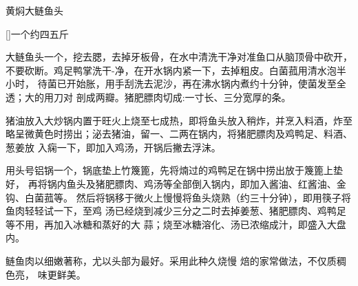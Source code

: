 \begin{recipe}{黄焖大鲢鱼头}

\ingredients

[\footnotemark]{一个约四五斤}

\preparation

\step 大鲢鱼头一个，挖去腮，去掉牙板骨，在水中清洗干净对准鱼口从脑顶骨中砍开，
不要砍断。鸡足鸭掌洗干-净，在开水锅内紧一下，去掉粗皮。白菌菰用清水泡半小时，
待菌已开始胀，用手刮洗去泥沙，再在沸水锅内煮约十分钟，使菌发至全透；大的用刀对
剖成两瓣。猪肥膘肉切成:一寸长、三分宽厚的条。

\step 猪油放入大炒锅内置于旺火上烧至七成热，即将鱼头放入稍炸，并烹入料酒，炸至
略呈微黄色时捞出；泌去猪油，留一、二两在锅内，将猪肥膘肉及鸡鸭足、料酒、葱姜放
入痫一下，即加入鸡汤，开锅后撇去浮沫。

\step 用头号铝锅一个，锅底垫上竹篾篦，先将煵过的鸡鸭足在锅中捞出放于篾篦上垫好，
再将锅内鱼头及猪肥膘肉、鸡汤等全部倒入锅内，即加入酱油、红酱油、金钩、白菌菰等。
然后将锅移于微火上慢慢将鱼头烧熟（约三十分钟），即用筷子将鱼肉轻轻试一下，至鸡
汤已经烧到减少三分之二时去掉姜葱、猪肥膘肉、鸡鸭足等不用，再加入冰糖和蒸好的大
蒜；烧至冰糖溶化、汤已浓缩成汁，即盛入大盘内。

\features

鲢鱼肉以细嫩著称，尤以头部为最好。采用此种久烧慢 焙的家常做法，不仅质稠色亮，
味更鲜美。


\end{recipe}

